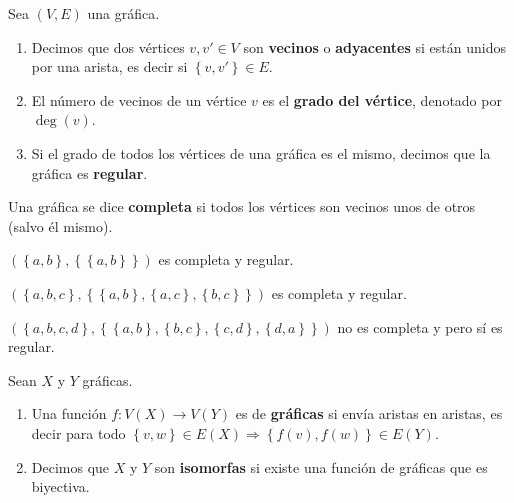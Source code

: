 \documentclass[12pt]{report}
\newcounter{it}
\theoremstyle{largebreak}
\newcommand\cf[3]{\ensuremath{#1:#2\rightarrow#3}}
\begin{document}
    \begin{mydef}
        Sea $(V,E)$ una gráfica.
        \begin{enumerate}
            \item Decimos que dos vértices $v,v'\in V$ son \textbf{vecinos} o \textbf{adyacentes} si están unidos por una arista, es decir si $\left\{v,v'\right\}\in E$.
            \item El número de vecinos de un vértice $v$ es el \textbf{grado del vértice}, denotado por $\deg(v)$.
            \item Si el grado de todos los vértices de una gráfica es el mismo, decimos que la gráfica es \textbf{regular}.
        \end{enumerate}
    \end{mydef}

    \begin{mydef}
        Una gráfica se dice \textbf{completa} si todos los vértices son vecinos unos de otros (salvo él mismo).
    \end{mydef}

    \begin{exa}
        $(\left\{a,b \right\},\left\{\left\{a,b\right\} \right\})$ es completa y regular.

        $(\left\{a,b,c \right\},\left\{\left\{a,b\right\},\left\{a,c\right\},\left\{b,c\right\} \right\})$ es completa y regular.

        $(\left\{a,b,c,d \right\},\left\{\left\{a,b\right\},\left\{b,c\right\},\left\{c,d\right\},\left\{d,a\right\} \right\})$ no es completa y pero sí es regular.
    \end{exa}

    \begin{mydef}
        Sean $X$ y $Y$ gráficas.
        \begin{enumerate}
            \item Una función $\cf{f}{V(X)}{V(Y)}$ es de \textbf{gráficas} si envía aristas en aristas, es decir para todo $\left\{v,w \right\}\in E(X)\Rightarrow\left\{f(v),f(w) \right\}\in E(Y)$.
            \item Decimos que $X$ y $Y$ son \textbf{isomorfas} si existe una función de gráficas que es biyectiva.
        \end{enumerate}
    \end{mydef}
\end{document}
